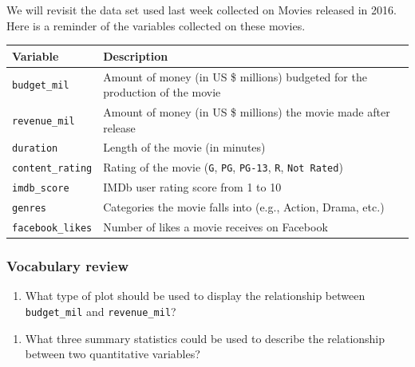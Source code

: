\documentclass[
]{report}
\providecommand{\tightlist}{%
  \setlength{\itemsep}{0pt}\setlength{\parskip}{0pt}}
\begin{document}
We will revisit the data set used last week collected on Movies released in 2016. Here is a reminder of the variables collected on these movies.

\begin{longtable}[]{@{}
  >{\raggedright\arraybackslash}p{}
  >{\raggedright\arraybackslash}p{}@{}}
\toprule
\textbf{Variable} & \textbf{Description} \\
\midrule
\endhead
\texttt{budget\_mil} & Amount of money (in US \$ millions) budgeted for the production of the movie \\
\texttt{revenue\_mil} & Amount of money (in US \$ millions) the movie made after release \\
\texttt{duration} & Length of the movie (in minutes) \\
\texttt{content\_rating} & Rating of the movie (\texttt{G}, \texttt{PG}, \texttt{PG-13}, \texttt{R}, \texttt{Not\ Rated}) \\
\texttt{imdb\_score} & IMDb user rating score from 1 to 10 \\
\texttt{genres} & Categories the movie falls into (e.g., Action, Drama, etc.) \\
\texttt{facebook\_likes} & Number of likes a movie receives on Facebook \\
\bottomrule
\end{longtable}

\hypertarget{vocabulary-review}{%
\subsubsection*{Vocabulary review}\label{vocabulary-review}}

\begin{enumerate}
\def\labelenumi{\arabic{enumi}.}
\tightlist
\item
  What type of plot should be used to display the relationship between \texttt{budget\_mil} and \texttt{revenue\_mil}?
\end{enumerate}

\vspace{0.2in}

\begin{enumerate}
\def\labelenumi{\arabic{enumi}.}
\setcounter{enumi}{1}
\tightlist
\item
  What three summary statistics could be used to describe the relationship between two quantitative variables?
\end{enumerate}
\end{document}
